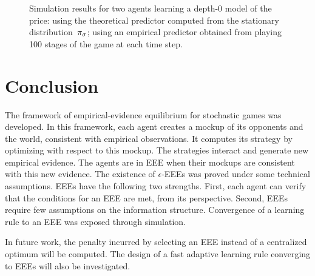 \begin{figure}
\centering
{}
\caption{Simulation results for two agents learning a depth-\(0\) model of the price:
 using the theoretical predictor computed from the stationary distribution~\(\pi_{\sigma}\);
 using an empirical predictor obtained from playing 100 stages of the game at each time step.}
\label{fig:simulation}
\end{figure}


\section{Conclusion}

The framework of empirical-evidence equilibrium for stochastic games was developed.
In this framework, each agent creates a mockup of its opponents and the world, consistent with empirical observations.
It computes its strategy by optimizing with respect to this mockup.
The strategies interact and generate new empirical evidence.
The agents are in EEE when their mockups are consistent with this new evidence.
The existence of \(\epsilon\)-EEEs was proved under some technical assumptions.
EEEs have the following two strengths.
First, each agent can verify that the conditions for an EEE are met, from its perspective.
Second, EEEs require few assumptions on the information structure.
Convergence of a learning rule to an EEE was exposed through simulation.

In future work, the penalty incurred by selecting an EEE instead of a centralized optimum will be computed.
The design of a fast adaptive learning rule converging to EEEs will also be investigated.
